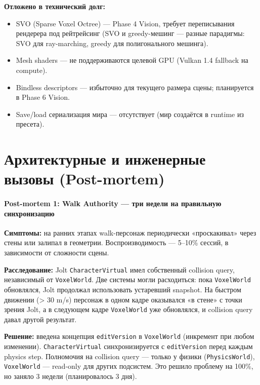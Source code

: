 \documentclass[
  11pt,a4paper,oneside]{article}
\providecommand{\tightlist}{%
  \setlength{\itemsep}{0pt}\setlength{\parskip}{0pt}}
\providecommand{\tightlist}{%
  \setlength{\itemsep}{0pt}\setlength{\parskip}{0pt}}
\begin{document}
\textbf{Отложено в технический долг:}

\begin{itemize}
\tightlist
\item
  SVO (Sparse Voxel Octree) --- Phase 4 Vision, требует переписывания рендерера под рейтрейсинг (SVO и greedy-мешинг --- разные парадигмы: SVO для ray-marching, greedy для полигонального мешинга).
\item
  Mesh shaders --- не поддерживаются целевой GPU (Vulkan 1.4 fallback на compute).
\item
  Bindless descriptors --- избыточно для текущего размера сцены; планируется в Phase 6 Vision.
\item
  Save/load сериализация мира --- отсутствует (мир создаётся в runtime из пресета).
\end{itemize}

\section{Архитектурные и инженерные вызовы (Post-mortem)}\label{ux430ux440ux445ux438ux442ux435ux43aux442ux443ux440ux43dux44bux435-ux438-ux438ux43dux436ux435ux43dux435ux440ux43dux44bux435-ux432ux44bux437ux43eux432ux44b-post-mortem}

\paragraph{Post-mortem 1: Walk Authority --- три недели на правильную синхронизацию}\label{post-mortem-1-walk-authority--ux442ux440ux438-ux43dux435ux434ux435ux43bux438-ux43dux430-ux43fux440ux430ux432ux438ux43bux44cux43dux443ux44e-ux441ux438ux43dux445ux440ux43eux43dux438ux437ux430ux446ux438ux44e}

\textbf{Симптомы:} на ранних этапах walk-персонаж периодически «проскакивал» через стены или залипал в геометрии. Воспроизводимость --- 5--10\% сессий, в зависимости от сложности сцены.

\textbf{Расследование:} Jolt \texttt{CharacterVirtual} имел собственный collision query, независимый от \texttt{VoxelWorld}. Две системы могли расходиться: пока \texttt{VoxelWorld} обновлялся, Jolt продолжал использовать устаревший snapshot. На быстром движении (\textgreater{} 30 m/s) персонаж в одном кадре оказывался «в стене» с точки зрения Jolt, а в следующем кадре \texttt{VoxelWorld} уже обновлялся, и collision query давал другой результат.

\textbf{Решение:} введена концепция \texttt{editVersion} в \texttt{VoxelWorld} (инкремент при любом изменении). \texttt{CharacterVirtual} синхронизируется с \texttt{editVersion} перед каждым physics step. Полномочия на collision query --- только у физики (\texttt{PhysicsWorld}), \texttt{VoxelWorld} --- read-only для других подсистем. Это решило проблему на 100\%, но заняло 3 недели (планировалось 3 дня).
\end{document}
